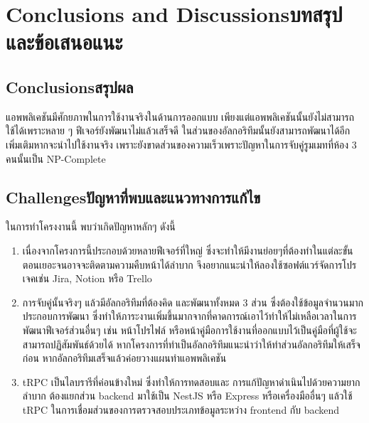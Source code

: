 \chapter{\ifenglish Conclusions and Discussions\else บทสรุปและข้อเสนอแนะ\fi}

\section{\ifenglish Conclusions\else สรุปผล\fi}

แอพพลิเคชันมีศักยภาพในการใช้งานจริงในด้านการออกแบบ เพียงแต่แอพพลิเคชันนั้นยังไม่สามารถใช้ได้เพราะหลาย ๆ ฟีเจอร์ยังพัฒนาไม่แล้วเสร็จดี
ในส่วนของอัลกอริทึมนั้นยังสามารถพัฒนาได้อีกเพิ่มเติมหากจะนำไปใช้งานจริง เพราะยังขาดส่วนของความเร็วเพราะปัญหาในการจับคู่รูมเมทที่ห้อง 3 คนนั้นเป็น
NP-Complete 

\section{\ifenglish Challenges\else ปัญหาที่พบและแนวทางการแก้ไข\fi}

ในการทำโครงงานนี้ พบว่าเกิดปัญหาหลักๆ ดังนี้
\begin{enumerate}
  \item เนื่องจากโครงการนี้ประกอบด้วยหลายฟีเจอร์ที่ใหญ่ ซึ่งจะทำให้มีงานย่อยๆที่ต้องทำในแต่ละขั้นตอนเยอะจนอาจจะติดตามความคืบหน้าได้ลำบาก
        จึงอยากแนะนำให้ลองใช้ซอฟต์แวร์จัดการโปรเจคเช่น Jira, Notion หรือ Trello
  \item การจับคู่นั้นจริงๆ แล้วมีอัลกอริทึมที่ต้องคิด และพัฒนาทั้งหมด 3 ส่วน ซึ่งต้องใช้ข้อมูลจำนวนมากประกอบการพัฒนา
        ซึ่งทำให้ภาระงานเพิ่มขึ้นมากจากที่คาดการณ์เอาไว้ทำให้ไม่เหลือเวลาในการพัฒนาฟีเจอร์ส่วนอื่นๆ เช่น หน้าโปรไฟล์ 
        หรือหน้าคู่มือการใช้งานที่ออกแบบไว้เป็นคู่มือที่ผู้ใช้จะสามารถปฏิสัมพันธ์ด้วยได้ หากโครงการที่ทำเป็นอัลกอริทึมแนะนำว่าให้ทำส่วนอัลกอริทึมให้เสร็จก่อน
        หากอัลกอริทึมเสร็จแล้วค่อยวางแผนทำแอพพลิเคชัน
  \item tRPC เป็นไลบรารีที่ค่อนข้างใหม่ ซึ่งทำให้การทดสอบและ การแก้ปัญหาดำเนินไปด้วยความยากลำบาก ต้องแยกส่วน backend มาใช้เป็น 
        NestJS หรือ Express หรือเครื่องมืออื่นๆ แล้วใช้ tRPC ในการเชื่อมส่วนของการตรวจสอบประเภทข้อมูลระหว่าง frontend กับ backend
\end{enumerate}


